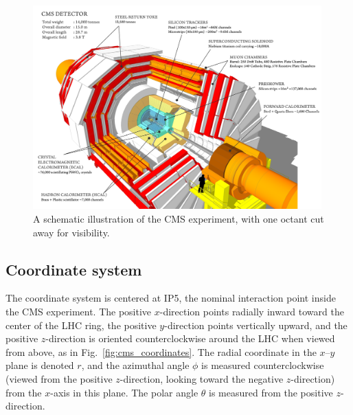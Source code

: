 \documentclass[oneside, letterpaper, 12pt, oldfontcommands]{memoir}
\begin{document}
\begin{figure}[hbtp]
  \begin{center}
    \includegraphics[width=0.99\textwidth]{Figures/cms_annotated.png}
    \caption{
    A schematic illustration of the CMS experiment, with one octant cut away for visibility.
    }
    \label{fig:cms_annotated}
  \end{center}
\end{figure}

\subsection{Coordinate system} \label{sec:LHCCMS_CMS_coordinates}
The coordinate system is centered at IP5, the nominal interaction point inside the CMS experiment.
The positive $x$-direction points radially inward toward the center of the LHC ring, the positive $y$-direction
points vertically upward, and the positive $z$-direction is oriented counterclockwise around the LHC when viewed
from above, as in Fig.~\ref{fig:cms_coordinates}.
The radial coordinate in the $x$--$y$ plane is denoted $r$, and the azimuthal angle $\phi$ is measured counterclockwise
(viewed from the positive $z$-direction, looking toward the negative $z$-direction) from the $x$-axis in this plane.
The polar angle $\theta$ is measured from the positive $z$-direction.
\end{document}

